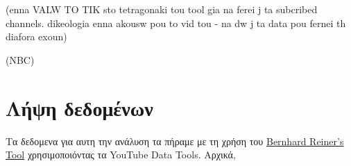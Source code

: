 \documentclass[12pt]{article}
\begin{document}
	(enna VALW TO TIK sto tetragonaki tou tool gia na ferei j ta subcribed channels. dikeologia enna akousw pou to vid tou - na dw j ta data pou fernei th diafora exoun)
	
	(NBC)
	\label{chap:intro}  %
	
	\section{Λήψη δεδομένων}
	Τα δεδομενα για αυτη την ανάλυση τα πήραμε με τη χρήση του \href{https://labs.polsys.net}{Bernhard Reiner's Tool} χρησιμοποιόντας τα YouTube Data Tools. Αρχικά, 
	\label{chap:data_fetching}  %
	
\end{document}
